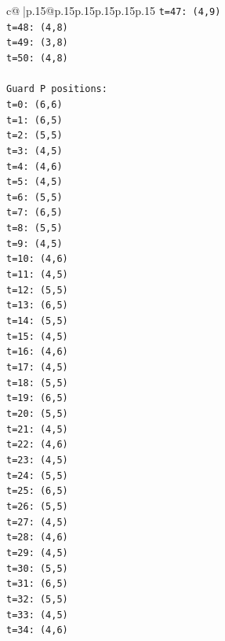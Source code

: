 \documentclass{article}
\begin{document}
{\begin{supertabular}{c@{$\;$}|p{.15\linewidth}@{}p{.15\linewidth}p{.15\linewidth}p{.15\linewidth}p{.15\linewidth}p{.15\linewidth}}
{{{\texttt{t=47: (4,9)} \\
\texttt{t=48: (4,8)} \\
\texttt{t=49: (3,8)} \\
\texttt{t=50: (4,8)} \\
\\ 
\texttt{Guard P positions:} \\
\texttt{t=0: (6,6)} \\
\texttt{t=1: (6,5)} \\
\texttt{t=2: (5,5)} \\
\texttt{t=3: (4,5)} \\
\texttt{t=4: (4,6)} \\
\texttt{t=5: (4,5)} \\
\texttt{t=6: (5,5)} \\
\texttt{t=7: (6,5)} \\
\texttt{t=8: (5,5)} \\
\texttt{t=9: (4,5)} \\
\texttt{t=10: (4,6)} \\
\texttt{t=11: (4,5)} \\
\texttt{t=12: (5,5)} \\
\texttt{t=13: (6,5)} \\
\texttt{t=14: (5,5)} \\
\texttt{t=15: (4,5)} \\
\texttt{t=16: (4,6)} \\
\texttt{t=17: (4,5)} \\
\texttt{t=18: (5,5)} \\
\texttt{t=19: (6,5)} \\
\texttt{t=20: (5,5)} \\
\texttt{t=21: (4,5)} \\
\texttt{t=22: (4,6)} \\
\texttt{t=23: (4,5)} \\
\texttt{t=24: (5,5)} \\
\texttt{t=25: (6,5)} \\
\texttt{t=26: (5,5)} \\
\texttt{t=27: (4,5)} \\
\texttt{t=28: (4,6)} \\
\texttt{t=29: (4,5)} \\
\texttt{t=30: (5,5)} \\
\texttt{t=31: (6,5)} \\
\texttt{t=32: (5,5)} \\
\texttt{t=33: (4,5)} \\
\texttt{t=34: (4,6)} \\
}}}
\end{supertabular}}
\end{document}
